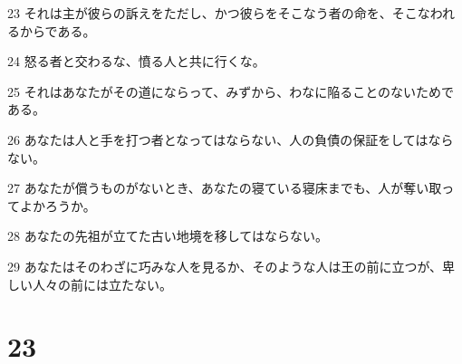 \par 23 それは主が彼らの訴えをただし、かつ彼らをそこなう者の命を、そこなわれるからである。
\par 24 怒る者と交わるな、憤る人と共に行くな。
\par 25 それはあなたがその道にならって、みずから、わなに陥ることのないためである。
\par 26 あなたは人と手を打つ者となってはならない、人の負債の保証をしてはならない。
\par 27 あなたが償うものがないとき、あなたの寝ている寝床までも、人が奪い取ってよかろうか。
\par 28 あなたの先祖が立てた古い地境を移してはならない。
\par 29 あなたはそのわざに巧みな人を見るか、そのような人は王の前に立つが、卑しい人々の前には立たない。

\chapter{23}

